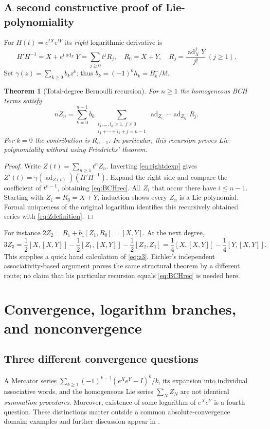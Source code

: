 \documentclass[11pt]{article}
\newtheorem{theorem}{Theorem}[section]
\theoremstyle{definition}
\theoremstyle{remark}
\newcommand{\ad}{\operatorname{ad}}
\numberwithin{equation}{section}
\begin{document}
\subsection{A second constructive proof of Lie-polynomiality}
For $H(t)=e^{tX}e^{tY}$ its \emph{right} logarithmic derivative is
\begin{equation}\label{eq:Rcoeff}
 H'H^{-1}=X+e^{t\ad_X}Y=\sum_{j\geq0}t^jR_j,
 \quad R_0=X+Y,\quad R_j=\frac{\ad_X^jY}{j!}\ (j\geq1).
\end{equation}
Set $\gamma(z)=\sum_{k\geq0}b_kz^k$; thus $b_k=(-1)^kh_k=B_k^-/k!$.
\begin{theorem}[Total-degree Bernoulli recursion]\label{thm:BCHrec}
For $n\geq1$ the homogeneous BCH terms satisfy
\begin{equation}\label{eq:BCHrec}
 nZ_n=\sum_{k=0}^{n-1}b_k
 \sum_{\substack{i_1,\ldots,i_k\geq1,\ j\geq0\\
                  i_1+\cdots+i_k+j=n-1}}
 \ad_{Z_{i_1}}\cdots\ad_{Z_{i_k}}R_j.
\end{equation}
For $k=0$ the contribution is $R_{n-1}$. In particular, this recursion proves Lie-polynomiality without using Friedrichs' theorem.
\end{theorem}
\begin{proof}
Write $Z(t)=\sum_{n\geq1}t^nZ_n$. Inverting \eqref{eq:rightdexp} gives
$Z'(t)=\gamma(\ad_{Z(t)})(H'H^{-1})$. Expand the right side and compare the coefficient of $t^{n-1}$, obtaining \eqref{eq:BCHrec}. All $Z_i$ that occur there have $i\leq n-1$. Starting with $Z_1=R_0=X+Y$, induction shows every $Z_n$ is a Lie polynomial. Formal uniqueness of the original logarithm identifies this recursively obtained series with \eqref{eq:Zdefinition}.
\end{proof}
For instance $2Z_2=R_1+b_1[Z_1,R_0]=[X,Y]$. At the next degree,
\[
 3Z_3=\frac12[X,[X,Y]]-\frac12[Z_1,[X,Y]]
                        -\frac12[Z_2,Z_1]
       =\frac14[X,[X,Y]]-\frac14[Y,[X,Y]].
\]
This supplies a quick hand calculation of \eqref{eq:z3}. Eichler's independent associativity-based argument \cite{eichler} proves the same structural theorem by a different route; no claim that his particular recursion equals \eqref{eq:BCHrec} is needed here.

\section{Convergence, logarithm branches, and nonconvergence}\label{sec:convergence}
\subsection{Three different convergence questions}
A Mercator series $\sum_{k\geq1}(-1)^{k-1}(e^Xe^Y-I)^k/k$, its expansion into individual associative words, and the homogeneous Lie series $\sum_NZ_N$ are not identical \emph{summation procedures}. Moreover, existence of some logarithm of $e^Xe^Y$ is a fourth question. These distinctions matter outside a common absolute-convergence domain; examples and further discussion appear in \cite{biagi}.
\end{document}
